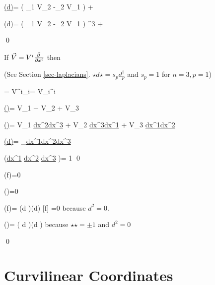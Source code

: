 \beq
\ul{(\star d\flat)\vecV}=
\left(
\partial_1 V_2 -\partial_2 V_1
\right)
+ 
\eeq

\beq
\ul{(\sharp\star d\flat)\vecV}=
\left(
\partial_1 V_2 -\partial_2 V_1
\right)
^3
+ 
\eeq

\qed


\begin{claim}
If ${\vec{V}}=V^i \frac{\vec{\partial}\;}{\partial x^i}$ then

\beq
\bcen
{}\ecen
\quad\quad
{}
\eeq
(See Section \ref{sec-laplacians}. $\star d \star =s_p d^\dag_p$ and $s_p=1$ for $n=3, p=1$)
\end{claim}
\proof

\beq
\vecV = V^i\hatx_i= V_i\hatx^i
\eeq


\beq
\ul{(\flat)\vecV}=
V_1 
+ V_2 
+ V_3 
\eeq

\beq
\ul{(\star\flat)\vecV}=
V_1 \ul{dx^2}{}\wedge \ul{dx^3}{}
+ V_2 \ul{dx^3}{}\wedge \ul{dx^1}{}
+ V_3 \ul{dx^1}{}\wedge \ul{dx^2}{}
\eeq

\beq
\ul{(d\star\flat)\vecV}=
_{\nabla\cdot {}}\ul{dx^1}{}\wedge \ul{dx^2}{}\wedge \ul{dx^3}{}
\eeq

\beq
\star(\ul{dx^1}\wedge
\ul{dx^2} \wedge
\ul{dx^3}
)= 1
\eeq
\qed

\begin{claim}

\beq
\nabla \times (\nabla f)=0
\eeq

\beq
\nabla \cdot (\nabla \times \vecV)=0
\eeq
\end{claim}
\proof

\beq
\nabla \times (\nabla f)=
(\sharp \star  d  \flat)(\sharp d) [f] =0
\eeq
because $d^2=0$.

\beq
\nabla \cdot (\nabla \times \vecV)=
(\star
d
\star
\flat)(\sharp \star  d  \flat)
\eeq
because $\star\star=\pm 1$ and $d^2=0$

\qed








\section{Curvilinear Coordinates}
\label{sec-curvilinear-coords}

